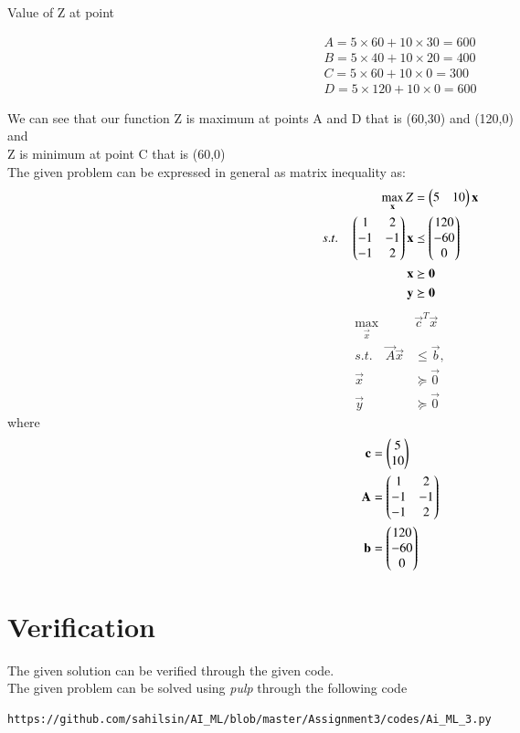 Value of Z at point

\begin{align*}
     A= 5\times 60 + 10 \times 30 =600
\\
     B= 5\times 40 + 10 \times 20 =400
\\
     C= 5\times 60 + 10 \times 0 =300
\\
     D= 5\times 120 + 10 \times 0 =600
\end{align*}

We can see that our function Z is maximum at points A and D that is (60,30) and (120,0)\\
and\\
Z is minimum at point C that is (60,0)\\
The given problem can be expressed in general as matrix inequality as:
\begin{align}
\max_{\mathbf{x}} Z &= \begin{pmatrix}5 & 10\end{pmatrix}\mathbf{x}
\\
s.t. \quad 
\begin{pmatrix}
1 & 2
\\
-1 & -1
\\
-1 & 2
\end{pmatrix}
\mathbf{x} &\preceq \begin{pmatrix}120\\-60\\0\end{pmatrix}
\\
\mathbf{x} &\succeq \mathbf{0}\\
\mathbf{y} &\succeq \mathbf{0}
\end{align}
\begin{align}
\max_{\vec{x}} &\vec{c}^{T}\vec{x}
\\
s.t. \quad \vec{A}\vec{x} &\le \vec{b},
\\
\vec{x} &\succeq\vec{0}\\
\vec{y} &\succeq \vec{0}
\end{align}
%
where
\begin{align}
\vec{c} &= \myvec{5 \\ 10}
\\
\vec{A} &=
\myvec{
1 & 2
\\
-1 & -1
\\
-1 & 2
}
\\
\vec{b}&=\myvec{120\\-60\\0}
%
\end{align}
%
%
\section{Verification}
The given solution can be verified through the given code.\\
The given problem can be solved using {\em pulp} through the following code
\begin{lstlisting}
https://github.com/sahilsin/AI_ML/blob/master/Assignment3/codes/Ai_ML_3.py
\end{lstlisting}

